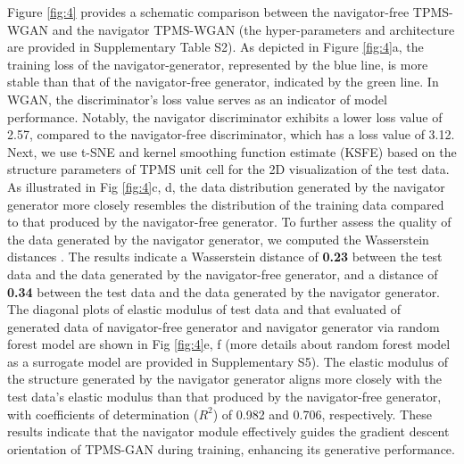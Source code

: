 \documentclass[preprint,review,12pt,authoryear]{elsarticle}
\begin{document}
Figure \ref{fig:4} provides a schematic comparison between the navigator-free TPMS-WGAN and the navigator TPMS-WGAN  (the hyper-parameters and architecture are provided in Supplementary Table S2). As depicted in Figure \ref{fig:4}a, the training loss of the navigator-generator, represented by the blue line, is more stable than that of the navigator-free generator, indicated by the green line. In WGAN, the discriminator's loss value serves as an indicator of model performance. Notably, the navigator discriminator exhibits a lower loss value of 2.57, compared to the navigator-free discriminator, which has a loss value of 3.12. Next, we use t-SNE and kernel smoothing function estimate (KSFE) based on the structure parameters of TPMS unit cell for the 2D visualization of the test data. As illustrated in Fig \ref{fig:4}c, d, the data distribution generated by the navigator generator more closely resembles the distribution of the training data compared to that produced by the navigator-free generator. To further assess the quality of the data generated by the navigator generator, we computed the Wasserstein distances \citep{Villani2008OptimalTO}. The results indicate a Wasserstein distance of \textbf{0.23} between the test data and the data generated by the navigator-free generator, and a distance of \textbf{0.34} between the test data and the data generated by the navigator generator. The diagonal plots of elastic modulus of test data and that evaluated of generated data of navigator-free generator and navigator generator via random forest model are shown in Fig \ref{fig:4}e, f (more details about random forest model as a surrogate model are provided in Supplementary S5). The elastic modulus of the structure generated by the navigator generator aligns more closely with the test data's elastic modulus than that produced by the navigator-free generator, with coefficients of determination ($R^2$) of 0.982 and 0.706, respectively. These results indicate that the navigator module effectively guides the gradient descent orientation of TPMS-GAN during training, enhancing its generative performance.
\end{document}
